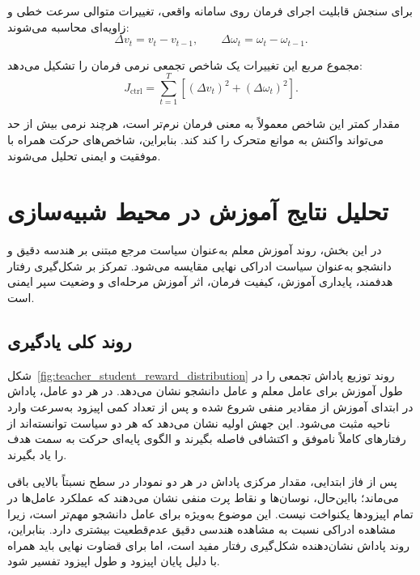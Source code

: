 برای سنجش قابلیت اجرای فرمان روی سامانه واقعی، تغییرات متوالی سرعت خطی و زاویه‌ای محاسبه می‌شوند:
\begin{equation}
	\Delta v_t = v_t - v_{t-1},
	\qquad
	\Delta \omega_t = \omega_t - \omega_{t-1}.
	\label{eq:control_variation_definition}
\end{equation}

مجموع مربع این تغییرات یک شاخص تجمعی نرمی فرمان را تشکیل می‌دهد:
\begin{equation}
	J_{\mathrm{ctrl}} =
	\sum_{t=1}^{T}
	\left[
	(\Delta v_t)^2 +
	(\Delta \omega_t)^2
	\right].
	\label{eq:control_smoothness_definition}
\end{equation}

مقدار کمتر این شاخص معمولاً به معنی فرمان نرم‌تر است، هرچند نرمی بیش از حد می‌تواند واکنش به موانع متحرک را کند کند. بنابراین، شاخص‌های حرکت همراه با موفقیت و ایمنی تحلیل می‌شوند.

\section{تحلیل نتایج آموزش در محیط شبیه‌سازی}
\label{sec:training_results_analysis}

در این بخش، روند آموزش معلم به‌عنوان سیاست مرجع مبتنی بر هندسه دقیق و دانشجو به‌عنوان سیاست ادراکی نهایی مقایسه می‌شود. تمرکز بر شکل‌گیری رفتار هدفمند، پایداری آموزش، کیفیت فرمان، اثر آموزش مرحله‌ای و وضعیت سپر ایمنی است.

\subsection{روند کلی یادگیری}
\label{subsec:overall_training_trend}

شکل~\ref{fig:teacher_student_reward_distribution} روند توزیع پاداش تجمعی را در طول آموزش برای عامل معلم و عامل دانشجو نشان می‌دهد. در هر دو عامل، پاداش در ابتدای آموزش از مقادیر منفی شروع شده و پس از تعداد کمی اپیزود به‌سرعت وارد ناحیه مثبت می‌شود. این جهش اولیه نشان می‌دهد که هر دو سیاست توانسته‌اند از رفتارهای کاملاً ناموفق و اکتشافی فاصله بگیرند و الگوی پایه‌ای حرکت به سمت هدف را یاد بگیرند.

پس از فاز ابتدایی، مقدار مرکزی پاداش در هر دو نمودار در سطح نسبتاً بالایی باقی می‌ماند؛ بااین‌حال، نوسان‌ها و نقاط پرت منفی نشان می‌دهند که عملکرد عامل‌ها در تمام اپیزودها یکنواخت نیست. این موضوع به‌ویژه برای عامل دانشجو مهم‌تر است، زیرا مشاهده ادراکی نسبت به مشاهده هندسی دقیق عدم‌قطعیت بیشتری دارد. بنابراین، روند پاداش نشان‌دهنده شکل‌گیری رفتار مفید است، اما برای قضاوت نهایی باید همراه با دلیل پایان اپیزود و طول اپیزود تفسیر شود.

